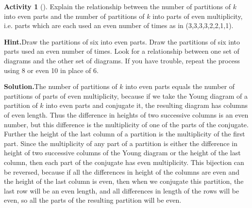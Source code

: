 \documentclass[10pt,]{book}
\theoremstyle{plain}
\theoremstyle{definition}
\newtheorem{activity}[project]{Activity}
\numberwithin{equation}{chapter}
\begin{document}
\begin{activity}[]\label{activity-154}
Explain the relationship between the number of partitions of \(k\) into even parts and the number of partitions of \(k\) into parts of even multiplicity, i.e. parts which are each used an even number of times as in (3,3,3,3,2,2,1,1).%
\par\medskip\noindent%
\textbf{Hint.}\quad Draw the partitions of six into even parts. Draw the partitions of six into parts used an even number of times. Look for a relationship between one set of diagrams and the other set of diagrams. If you have trouble, repeat the process using 8 or even 10 in place of 6.%
\par\medskip\noindent%
\textbf{Solution.}\quad The number of partitions of \(k\) into even parts equals the number of partitions of parts of even multiplicity, because if we take the Young diagram of a partition of \(k\) into even parts and conjugate it, the resulting diagram has columns of even length. Thus the difference in heights of two successive columns is an even number, but this difference is the multiplicity of one of the parts of the conjugate. Further the height of the last column of a partition is the multiplicity of the first part. Since the multiplicity of any part of a partition is either the difference in height of two successive columns of the Young diagram or the height of the last column, then each part of the conjugate has even multiplicity. This bijection can be reversed, because if all the differences in height of the columns are even and the height of the last column is even, then when we conjugate this partition, the last row will be an even length, and all differences in length of the rows will be even, so all the parts of the resulting partition will be even.%
\end{activity}
\end{document}
